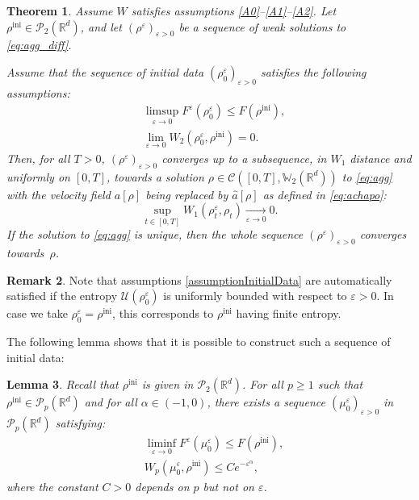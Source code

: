 \documentclass[JEP,XML,SOM,Unicode, NoFloatCountersInSection,published]{cedram}
\newcommand{\ini}{\mathrm{ini}}
\def\RR{\mathbb{R}}
\def\WW{\mathbb{W}}
\newcommand{\limi}[2]{\underset{#1 \to #2}{\longrightarrow}}
\def\eps{\varepsilon}
\def\calC{{\mathcal C}}
\def\calP{{\mathcal P}}
\def\calU{{\mathcal U}}
\def\achapo{\widehat{a}}
\theoremstyle{plain}
\newtheorem{theorem}{Theorem}[section]
\newtheorem{lemma}[theorem]{Lemma}
\theoremstyle{definition}
\newtheorem{remark}[theorem]{Remark}
\begin{document}
\begin{theorem}\label{thm:cvLipschitz}
Assume $W$ satisfies assumptions \eqref{A0}--\eqref{A1}--\eqref{A2}. Let $\rho^{\ini} \in \calP_2(\RR^d)$, and let $(\rho^\eps)_{\eps > 0}$ be a sequence of weak solutions to \eqref{eq:agg_diff}.

Assume that the sequence of initial data $(\rho_0^\eps)_{\eps > 0}$ satisfies the following assumptions:%
\begin{subequations}\label{assumptionInitialData}
\begin{align}
& \limsup_{\eps \to 0} F^\eps(\rho_0^\eps) \leq F(\rho^{\ini}), \label{assumptionInitialData:1} \\
& \lim_{\eps \to 0} W_2(\rho_0^\eps,\rho^{\ini}) = 0. \label{assumptionInitialData:4}
\end{align}
\end{subequations}
Then, for all $T>0$, $(\rho^\eps)_{\eps > 0}$ converges up to a subsequence, in $W_1$ distance and uniformly on $[0,T]$, towards a solution $\rho \in \calC([0,T], \WW _2(\RR^d))$ to \eqref{eq:agg} with the velocity field $a[\rho]$ being replaced by $\achapo[\rho]$ as defined in \eqref{eq:achapo}:
\[
\sup_{t \in [0,T]} W_1(\rho_t^\eps, \rho_t) \limi{\eps}{0} 0.
\]
If the solution to \eqref{eq:agg} is unique, then the whole sequence $(\rho^\eps)_{\eps > 0}$ converges towards~$\rho$.
\end{theorem}
\begin{remark}
Note that assumptions \eqref{assumptionInitialData} are automatically satisfied if the entropy $\calU(\rho_0^\eps)$ is uniformly bounded with respect to $\eps>0$. In case we take $\rho_0^\eps = \rho^{\ini}$, this corresponds to $\rho^{\ini}$ having finite entropy.
\end{remark}
The following lemma shows that it is possible to construct such a sequence of initial data:
\begin{lemma}\label{lemma:initialData}
Recall that $\rho^{\ini}$ is given in $\calP_2(\RR^d)$. For all $p \geq 1$ such that $\rho^{\ini} \in \calP_p(\RR^d)$ and for all $\alpha \in (-1,0)$, there exists a sequence $(\mu_0^\eps)_{\eps > 0}$ in $\calP_p(\RR^d)$ satisfying:
\begin{subequations}\label{smoothedInitialData}
\begin{align}
& \liminf_{\eps \to 0} F^\eps(\mu_0^\eps) \leq F(\rho^{\ini}), \label{smoothedInitialData:1} \\
& W_p(\mu_0^\eps,\rho^{\ini}) \leq Ce^{-\eps^\alpha},\label{smoothedInitialData:4}
\end{align}
\end{subequations}
where the constant $C>0$ depends on $p$ but not on $\eps$.
\end{lemma}
\end{document}
